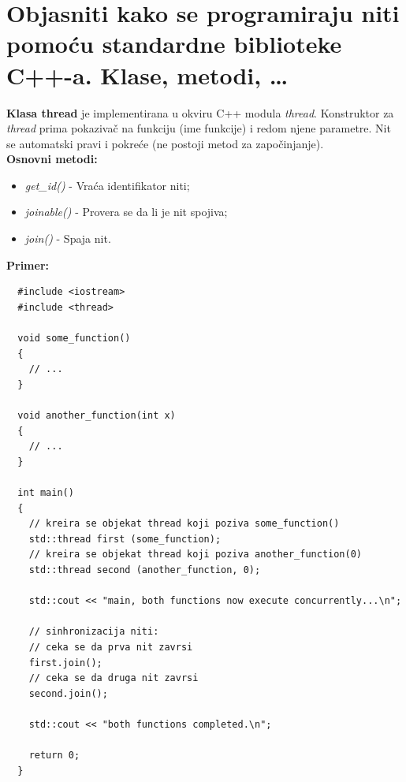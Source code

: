 \documentclass[a4paper]{article}
\begin{document}
\section{Objasniti kako se programiraju niti pomoću standardne biblioteke C++-a. Klase, metodi, \dots}
  \textbf{Klasa thread} je implementirana u okviru C++ modula \textit{thread}. Konstruktor za
  \textit{thread} prima pokazivač na funkciju (ime funkcije) i redom njene parametre. Nit se automatski
  pravi i pokreće (ne postoji metod za započinjanje). \cite{cppref_thread} \\
  \textbf{Osnovni metodi:}
  \begin{itemize}
    \item \textit{get\_id()} - Vraća identifikator niti;
    \item \textit{joinable()} - Provera se da li je nit spojiva;
    \item \textit{join()} - Spaja nit.
  \end{itemize}
  \textbf{Primer:}
\begin{lstlisting}
  #include <iostream>
  #include <thread>
   
  void some_function() 
  {
    // ...
  }
  
  void another_function(int x)
  {
    // ...
  }
  
  int main() 
  {
    // kreira se objekat thread koji poziva some_function()
    std::thread first (some_function);   
    // kreira se objekat thread koji poziva another_function(0)  
    std::thread second (another_function, 0);  
  
    std::cout << "main, both functions now execute concurrently...\n";
  
    // sinhronizacija niti:
    // ceka se da prva nit zavrsi
    first.join();        
    // ceka se da druga nit zavrsi        
    second.join();              
  
    std::cout << "both functions completed.\n";
  
    return 0;
  }\end{lstlisting}
\end{document}
